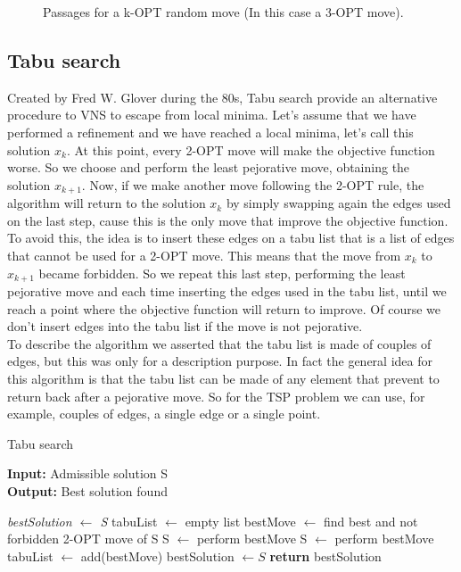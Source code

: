 \begin{figure}[h!]
\begin{subfigure}[b]{0.49\linewidth}
    \caption{}
  \end{subfigure}
  \caption{Passages for a k-OPT random move (In this case a 3-OPT move).}
  \label{fig:vns}
\end{figure}


\subsection{Tabu search}
Created by Fred W. Glover during the 80s, Tabu search provide an alternative procedure to VNS to escape from local minima. Let's assume that we have performed a refinement and we have reached a local minima, let's call this solution $x_k$. At this point, every 2-OPT move will make the objective function worse. So we choose and perform the least pejorative move, obtaining the solution $x_{k+1}$. Now, if we make another move following the 2-OPT rule, the algorithm will return to the solution $x_{k}$ by simply swapping again the edges used on the last step, cause this is the only move that improve the objective function. To avoid this, the idea is to insert these edges on a tabu list that is a list of edges that cannot be used for a 2-OPT move. This means that the move from $x_{k}$ to $x_{k+1}$ became forbidden. So we repeat this last step, performing the least pejorative move and each time inserting the edges used in the tabu list, until we reach a point where the objective function will return to improve. Of course we don't insert edges into the tabu list if the move is not pejorative. \\
To describe the algorithm we asserted that the tabu list is made of couples of edges, but this was only for a description purpose. In fact the general idea for this algorithm is that the tabu list can be made of any element that prevent to return back after a pejorative move. So for the TSP problem we can use, for example, couples of edges, a single edge or a single point. \\

\begin{algorithm}
	\caption{Tabu search}\label{TabuSearch method}
	\hspace*{\algorithmicindent} \textbf{Input:} Admissible solution S \\
	\hspace*{\algorithmicindent} \textbf{Output:} Best solution found
    \begin{algorithmic}[1]
    		\State \textit{bestSolution $\leftarrow$ S}
				\State tabuList $\leftarrow$ empty list
			\EndIf
			\State bestMove $\leftarrow$ find best and not forbidden 2-OPT move of S
				\State S $\leftarrow$ perform bestMove
			\Else
				\State S $\leftarrow$ perform bestMove
				\State tabuList $\leftarrow$ add(bestMove)
			\EndIf
				\State bestSolution $\leftarrow S$
			\EndIf
		\EndWhile
		\State \textbf{return} bestSolution
    \end{algorithmic}
\end{algorithm}

